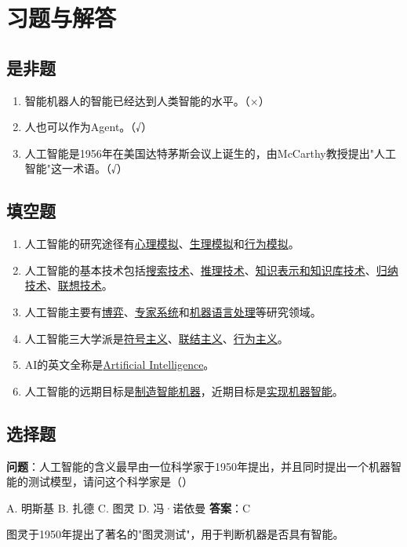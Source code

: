 \section{习题与解答}

\subsection{是非题}

\begin{enumerate}[leftmargin=2em,itemsep=2pt]
    \item 智能机器人的智能已经达到人类智能的水平。（×）
    \item 人也可以作为Agent。（√）
    \item 人工智能是1956年在美国达特茅斯会议上诞生的，由McCarthy教授提出"人工智能"这一术语。（√）
\end{enumerate}

\subsection{填空题}

\begin{enumerate}[leftmargin=2em,itemsep=2pt]
    \item 人工智能的研究途径有\underline{心理模拟}、\underline{生理模拟}和\underline{行为模拟}。
    \item 人工智能的基本技术包括\underline{搜索技术}、\underline{推理技术}、\underline{知识表示和知识库技术}、\underline{归纳技术}、\underline{联想技术}。
    \item 人工智能主要有\underline{博弈}、\underline{专家系统}和\underline{机器语言处理}等研究领域。
    \item 人工智能三大学派是\underline{符号主义}、\underline{联结主义}、\underline{行为主义}。
    \item AI的英文全称是\underline{Artificial Intelligence}。
    \item 人工智能的远期目标是\underline{制造智能机器}，近期目标是\underline{实现机器智能}。
\end{enumerate}

\subsection{选择题}

\begin{examplebox}[选择题1.1]
\textbf{问题}：人工智能的含义最早由一位科学家于1950年提出，并且同时提出一个机器智能的测试模型，请问这个科学家是（\quad）

A. 明斯基 \quad B. 扎德 \quad C. 图灵 \quad D. 冯·诺依曼
\tcblower
\textbf{答案}：C

图灵于1950年提出了著名的"图灵测试"，用于判断机器是否具有智能。
\end{examplebox}

